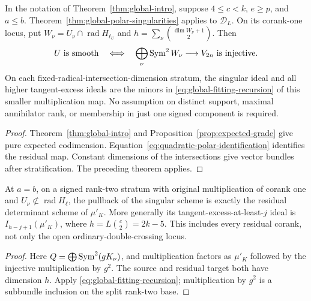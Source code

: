 \begin{corollary}
\label{cor:global-binary-singularities}
In the notation of Theorem~\ref{thm:global-intro}, suppose
$4\le c<k$, $e\ge p$, and $a\le b$. Theorem~\ref{thm:global-polar-singularities}
applies to $\mathscr D_L$. On its corank-one locus, put
$W_\nu=U_\nu\cap\operatorname{rad}H_{\ell_U}$ and
$h=\sum_\nu\binom{\dim W_\nu+1}{2}$. Then
\begin{equation}\label{eq:all-rank-singularity-test}
 U\text{ is smooth}\quad\Longleftrightarrow\quad
 \bigoplus_\nu\operatorname{Sym}^2W_\nu\longrightarrow V_{2n}
 \text{ is injective}.
\end{equation}
On each fixed-radical-intersection-dimension stratum, the singular
ideal and all higher tangent-excess ideals are the minors in
\eqref{eq:global-fitting-recursion} of this smaller multiplication map.
No assumption on distinct support, maximal annihilator rank, or
membership in just one signed component is required.
\end{corollary}
\begin{proof}
Theorem~\ref{thm:global-intro} and
Proposition~\ref{prop:expected-grade} give pure expected codimension.
Equation~\eqref{eq:quadratic-polar-identification} identifies the
residual map. Constant dimensions of the intersections give vector
bundles after stratification. The preceding theorem applies.
\end{proof}

\begin{corollary}
\label{cor:whole-residual-wall}
At $a=b$, on a signed rank-two stratum with original multiplication
of corank one and $U_\nu\not\subset\operatorname{rad}H_\ell$, the
pullback of the singular scheme is exactly the residual determinant
scheme of $\mu'_K$. More generally its tangent-excess-at-least-$j$
ideal is $I_{h-j+1}(\mu'_K)$, where
$h=L\binom c2=2k-5$. This includes every residual corank, not only
the open ordinary-double-crossing locus.
\end{corollary}
\begin{proof}
Here $Q=\bigoplus\operatorname{Sym}^2(gK_\nu)$, and multiplication factors as
$\mu'_K$ followed by the injective multiplication by $g^2$.
The source and residual target both have dimension $h$.
Apply \eqref{eq:global-fitting-recursion}; multiplication by $g^2$
is a subbundle inclusion on the split rank-two base.
\end{proof}

